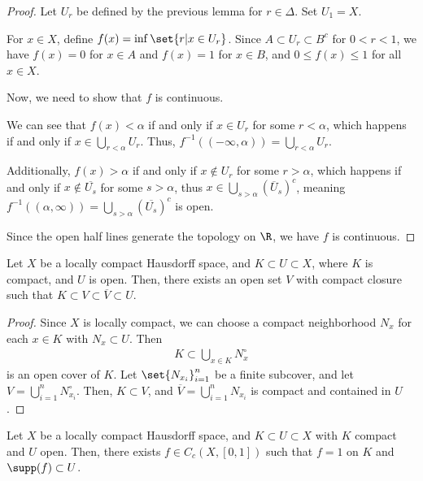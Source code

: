 \documentclass[10pt]{mypackage}
\begin{document}
\begin{proof}
  Let $U_r$ be defined by the previous lemma for $r\in \Delta$. Set $U_1 = X$.\newline

  For $x\in X$, define $f(x) = \inf\set{r| x\in U_r}$. Since $A\subset U_r \subset B^{c}$ for $0 < r < 1$, we have $f(x) = 0$ for $x\in A$ and $f(x) = 1$ for $x\in B$, and $0 \leq f(x) \leq 1$ for all $x\in X$.\newline

  Now, we need to show that $f$ is continuous. \newline

  We can see that $f(x) < \alpha$ if and only if $x\in U_{r}$ for some $r < \alpha$, which happens if and only if $x\in \bigcup_{r < \alpha}U_r$. Thus, $f^{-1}\left(\left(-\infty,\alpha\right)\right) = \bigcup_{r < \alpha}U_r$.\newline

  Additionally, $f(x) > \alpha$ if and only if $x\notin U_r$ for some $r > \alpha$, which happens if and only if $x\notin \overline{U_s}$ for some $s > \alpha$, thus $x\in \bigcup_{s > \alpha}\left(\overline{U}_{s}\right)^c$, meaning $f^{-1}\left(\left(\alpha,\infty\right)\right) = \bigcup_{s > \alpha}\left(\overline{U_s}\right)^c$ is open.\newline

  Since the open half lines generate the topology on $\R$, we have $f$ is continuous.
\end{proof}
\begin{proposition}
  Let $X$ be a locally compact Hausdorff space, and $K\subset U\subset X$, where $K$ is compact, and $U$ is open. Then, there exists an open set $V$ with compact closure such that $K\subset V\subset \overline{V}\subset U$.
\end{proposition}
\begin{proof}
  Since $X$ is locally compact, we can choose a compact neighborhood $N_x$ for each $x\in K$ with $N_x\subset U$. Then
  \begin{align*}
    K\subset \bigcup_{x\in K}N_x^{\circ}
  \end{align*}
  is an open cover of $K$. Let $\set{N_{x_i}}_{i=1}^{n}$ be a finite subcover, and let $V = \bigcup_{i=1}^{n}N_{x_i}^{\circ}$. Then, $K\subset V$, and $\overline{V} = \bigcup_{i=1}^{n}N_{x_i}$ is compact and contained in $U$.
\end{proof}
\begin{theorem}
  Let $X$ be a locally compact Hausdorff space, and $K\subset U\subset X$ with $K$ compact and $U$ open. Then, there exists $f\in C_c\left(X,[0,1]\right)$ such that $f = 1$ on $K$ and $\supp(f) \subset U$.
\end{theorem}
\end{document}
